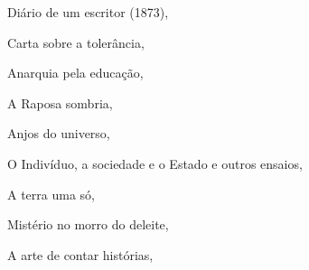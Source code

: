 \begin{multicols}{2}
\begin{enumerate}
{\item Diário de um escritor (1873), {}
\item Carta sobre a tolerância, {}
\item Anarquia pela educação, {}
\item A Raposa sombria, {}
\item Anjos do universo, {}
\item O Indivíduo, a sociedade e o Estado e outros ensaios, {}
\item A terra uma só, {}
\item Mistério no morro do deleite, {}
\item A arte de contar histórias, {}
}
\end{enumerate}
\end{multicols}

\pagebreak